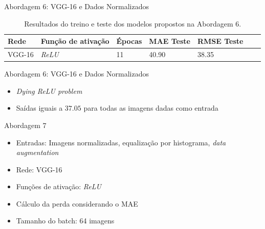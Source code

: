 \begin{frame}{Abordagem 6: VGG-16 e Dados Normalizados}
  \begin{table}[!ht]
    \centering
    \caption{Resultados do treino e teste dos modelos propostos na Abordagem 6.}
    \label{tab:results-6}
    \begin{tabular}{l l l l l l l}
      \toprule
      Rede & Função de ativação & Épocas & MAE Teste & RMSE Teste \\
      \midrule
      VGG-16 & \emph{ReLU} & 11 & 40.90 & 38.35 \\
      \bottomrule
    \end{tabular}
  \end{table}
\end{frame}

\begin{frame}{Abordagem 6: VGG-16 e Dados Normalizados}
  \begin{itemize}
    \item \emph{Dying ReLU problem}
    \item Saídas iguais a $37.05$ para todas as imagens dadas como entrada
  \end{itemize}
\end{frame}




\begin{frame}{Abordagem 7}
 \begin{itemize}
   \item Entradas: Imagens normalizadas, \alert{equalização por histograma, \emph{data augmentation}}
   \item Rede: VGG-16
   \item Funções de ativação: \emph{ReLU}
   \ \ \newline
   \item Cálculo da perda considerando o MAE
   \item Tamanho do batch: 64 imagens
   \end{itemize}
\end{frame}

